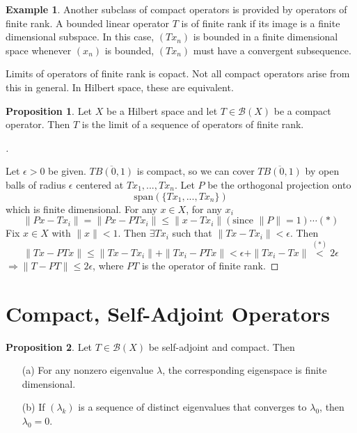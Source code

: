 \documentclass{article}
\theoremstyle{definition}
\newtheorem{ex}{Example}
\newtheorem{prop}{Proposition}
\newenvironment{proofs}[1][\proofname]{%
  \begin{proof}[#1]$ $\par\nobreak\ignorespaces
}{%
  \end{proof}
}
\newcommand{\B}{\mathcal B}
\begin{document}
\begin{ex}
	Another subclass of compact operators is provided by operators of finite rank.
	A bounded linear operator $T$ is of finite rank if its image is a finite dimensional subspace.
	In this case, $(T x_n)$ is bounded in a finite dimensional space whenever $(x_n)$ is bounded, $(T x_n)$ must have a convergent subsequence.
\end{ex}

Limits of operators of finite rank is copact.
Not all compact operators arise from this in general.
In Hilbert space, these are equivalent.

\begin{prop}
	Let $X$ be a Hilbert space and let $T \in \B(X)$ be a compact operator.
	Then $T$ is the limit of a sequence of operators of finite rank.
\end{prop}

\begin{proofs}
	Let $\epsilon > 0$ be given.
	$\overline{TB(0, 1)}$ is compact, so we can cover $\overline{TB(0, 1)}$ by open balls of radius $\epsilon$ centered at $T x_1, ..., T x_n$.
	Let $P$ be the orthogonal projection onto 
	\[
		\text{span}(\{T x_1, ..., T x_n\})
	\]
	which is finite dimensional.
	For any $x \in X$, for any $x_i$
	\[
		\|P x - T x_i\| = \|P x - P T x_i\| \leq \|x - T x_i\| (\text{since } \|P\| = 1) \cdots (*)
	\]
	Fix $x \in X$ with $\|x\| < 1$.
	Then $\exists T x_i$ such that $\|T x - T x_i\| < \epsilon$.
	Then 
	\[
		\| T x - P T x\| \leq \|T x - T x_i\| + \| T x_i - P T x\| < \epsilon + \|T x_i - T x\| \stackrel{(*)}{<} 2 \epsilon 
	\]
	$\Rightarrow \|T - P T\| \leq 2 \epsilon$, where $PT$ is the operator of finite rank.
\end{proofs}

\section{Compact, Self-Adjoint Operators}

\begin{prop}
	Let $T \in \B(X)$ be self-adjoint and compact.
	Then 
	\begin{enumerate}
		\item[(a)] For any nonzero eigenvalue $\lambda$, the corresponding eigenspace is finite dimensional.

		\item[(b)] If $(\lambda_k)$ is a sequence of distinct eigenvalues that converges to $\lambda_0$, then $\lambda_0 = 0$.
	\end{enumerate}
\end{prop}
\end{document}
